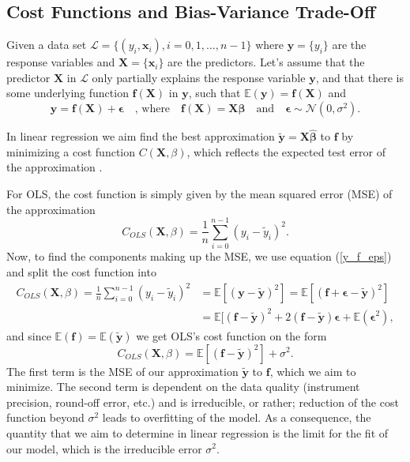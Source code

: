 \documentclass[]{article}
\begin{document}
\subsection{Cost Functions and Bias-Variance Trade-Off}

Given a data set $\mathcal{L} = \{(y_i, \mathbf{x}_i), i=0,1,...,n-1\}$ where $\mathbf{y} = \{y_i\}$ are the response variables and $\mathbf{X} = \{\mathbf{x}_i\}$ are the predictors. Let's assume that the predictor $\mathbf{X}$ in $\mathcal{L}$ only partially explains the response variable $\mathbf{y}$, and that there is some underlying function $\mathbf{f}(\mathbf{X})$ in $\mathbf{y}$, such that $\mathbb{E}(\mathbf{y}) = \mathbf{f}(\mathbf{X})$ and
\begin{equation}
\label{y_f_eps}
\mathbf{y} = \mathbf{f}(\mathbf{X}) + \mathbf{\epsilon} \quad \text{, where} \quad \mathbf{f}(\mathbf{X}) = \mathbf{X} \mathbf{\beta} \quad \text{and} \quad \mathbf{\epsilon} \sim \mathcal{N}(0, \sigma^2).
\end{equation}

In linear regression we aim find the best approximation $\mathbf{\tilde{y}} = \mathbf{X\hat{\beta}}$ to $\mathbf{f}$ by minimizing a cost function $C(\mathbf{X},\mathbb{\beta})$, which reflects the expected test error of the approximation \cite{james2013introduction}.

For OLS, the cost function is simply given by the mean squared error (MSE) of the approximation
\begin{equation}
\label{cost-ols}
	C_{OLS}(\mathbf{X},\mathbb{\beta}) = \frac{1}{n} \sum_{i=0}^{n-1} (y_i - \tilde{y}_i)^2.
\end{equation}
Now, to find the components making up the MSE, we use equation (\ref{y_f_eps}) and split the cost function into
\begin{equation*}
\begin{aligned}
	C_{OLS}(\mathbf{X},\mathbb{\beta}) = \frac{1}{n} \sum_{i=0}^{n-1} (y_i - \tilde{y}_i)^2 &= \mathbb{E}[(\mathbf{y} - \mathbf{\tilde{y}})^2] = \mathbb{E}[(\mathbf{f} + \mathbf{\epsilon} - \mathbf{\tilde{y}})^2] \\
	&= \mathbb{E}[(\mathbf{f} - \mathbf{\tilde{y}})^2 + 2(\mathbf{f} - \mathbf{\tilde{y}})\mathbf{\epsilon} + \mathbb{E}(\mathbf{\epsilon}^2),
\end{aligned}
\end{equation*}
and since $\mathbb{E}(\mathbf{f}) = \mathbb{E}(\mathbf{\tilde{y}})$ we get OLS's cost function on the form \cite{james2013introduction}
\begin{equation}
\label{red-irred}
	C_{OLS}(\mathbf{X},\mathbb{\beta}) = \mathbb{E}[(\mathbf{f} - \mathbf{\tilde{y}})^2] + \sigma^2.
\end{equation}
The first term is the MSE of our approximation $\mathbf{\tilde{y}}$ to $\mathbf{f}$, which we aim to minimize. The second term is dependent on the data quality (instrument precision, round-off error, etc.) and is irreducible, or rather; reduction of the cost function beyond $\sigma^2$ leads to overfitting of the model. As a consequence, the quantity that we aim to determine in linear regression is the limit for the fit of our model, which is the irreducible error $\sigma^2$.
\end{document}
